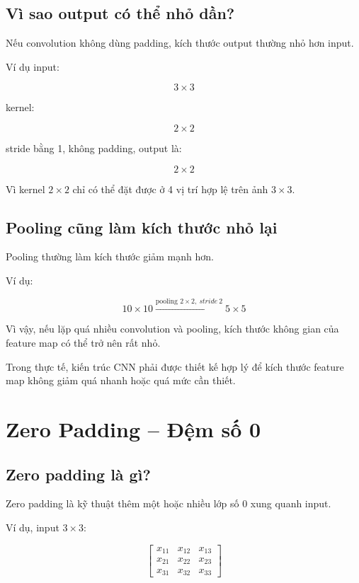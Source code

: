 \subsection{Vì sao output có thể nhỏ dần?}

Nếu convolution không dùng padding, kích thước output thường nhỏ hơn input.

Ví dụ input:

\[
    3\times3
\]

kernel:

\[
    2\times2
\]

stride bằng 1, không padding, output là:

\[
    2\times2
\]

Vì kernel $2\times2$ chỉ có thể đặt được ở 4 vị trí hợp lệ trên ảnh $3\times3$.

\subsection{Pooling cũng làm kích thước nhỏ lại}

Pooling thường làm kích thước giảm mạnh hơn.

Ví dụ:

\[
    10\times10
    \xrightarrow{\text{pooling }2\times2,\ stride\ 2}
    5\times5
\]

Vì vậy, nếu lặp quá nhiều convolution và pooling, kích thước không gian của feature map có thể trở nên rất nhỏ.

\begin{luuy}
Trong thực tế, kiến trúc CNN phải được thiết kế hợp lý để kích thước feature map không giảm quá nhanh hoặc quá mức cần thiết.
\end{luuy}

\section{Zero Padding -- Đệm số 0}

\subsection{Zero padding là gì?}

Zero padding là kỹ thuật thêm một hoặc nhiều lớp số 0 xung quanh input.

Ví dụ, input $3\times3$:

\[
    \begin{bmatrix}
    x_{11} & x_{12} & x_{13}\\
    x_{21} & x_{22} & x_{23}\\
    x_{31} & x_{32} & x_{33}
    \end{bmatrix}
\]

